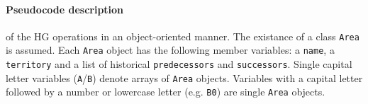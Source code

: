 


\paragraph{Pseudocode description} %
\label{par:pseudocode_description}

of the HG operations in an object-oriented manner. The existance of a class \texttt{Area} is assumed. Each \texttt{Area} object has the following member variables: a \texttt{name}, a \texttt{territory} and a list of historical \texttt{predecessors} and \texttt{successors}. Single capital letter variables (\texttt{A}/\texttt{B}) denote arrays of \texttt{Area} objects. Variables with a capital letter followed by a number or lowercase letter (e.g. \texttt{B0}) are single \texttt{Area} objects.

